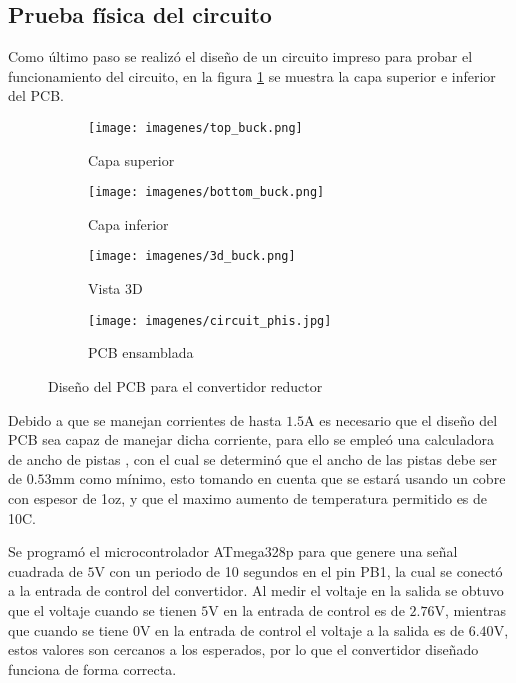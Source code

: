                                                                
\subsection{Prueba física del circuito}

Como último paso se realizó el diseño de un circuito impreso para probar el 
funcionamiento del circuito, en la figura \ref{fig:buck_pcb} se muestra la capa
superior e inferior del PCB.

\begin{figure}[H]
    \centering
    \begin{subfigure}{0.45\linewidth}
        \centering
        \texttt{[image: imagenes/top\_buck.png]}
        \caption{Capa superior}
    \end{subfigure}
    \begin{subfigure}{0.45\linewidth}
        \centering
        \texttt{[image: imagenes/bottom\_buck.png]}
        \caption{Capa inferior}
    \end{subfigure}
    \vfill
    \begin{subfigure}{0.45\linewidth}
        \centering
        \texttt{[image: imagenes/3d\_buck.png]}
        \caption{Vista 3D}
    \end{subfigure}
    \begin{subfigure}{0.45\linewidth}
        \centering
        \texttt{[image: imagenes/circuit\_phis.jpg]}
        \caption{PCB ensamblada}
    \end{subfigure}
    \caption{Diseño del PCB para el convertidor reductor}
    \label{fig:buck_pcb}
\end{figure}

Debido a que se manejan corrientes de hasta $1.5\text{A}$ es necesario que el
diseño del PCB sea capaz de manejar dicha corriente, para ello se empleó una 
calculadora de ancho de pistas \cite{noauthor_pcb_nodate}, con el cual se 
determinó que el ancho de las pistas debe ser de $0.53\text{mm}$ como mínimo,
esto tomando en cuenta que se estará usando un cobre con espesor de 1oz, y que
el maximo aumento de temperatura permitido es de 10\textordmasculine C. 

Se programó el microcontrolador ATmega328p para que genere una señal 
cuadrada de $5\text{V}$ con un periodo de 10 segundos en el pin PB1,
la cual se conectó a la entrada de control del convertidor. Al medir el voltaje
en la salida se obtuvo que el voltaje cuando se tienen $5\text{V}$ en la entrada
de control es de $2.76\text{V}$, mientras que cuando se tiene $0\text{V}$
en la entrada de control el voltaje a la salida es de $6.40\text{V}$, estos 
valores son cercanos a los esperados, por lo que el convertidor diseñado
funciona de forma correcta.

